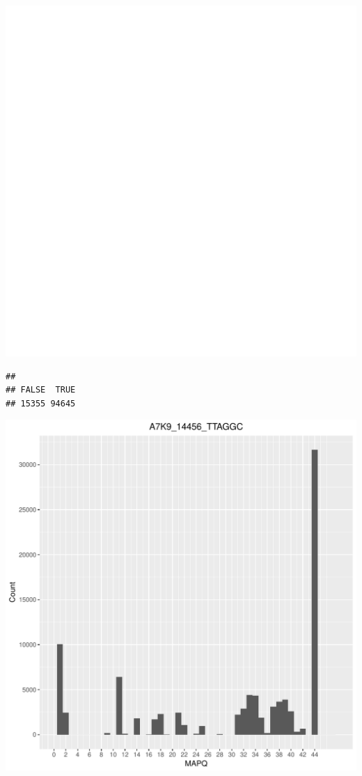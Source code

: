\documentclass[12pt, a4paper]{article}\usepackage[]{graphicx}\usepackage[]{color}
\makeatletter
\def\maxwidth{ %
  \ifdim\Gin@nat@width>\linewidth
    \linewidth
  \else
    \Gin@nat@width
  \fi
}
\newenvironment{kframe}{%
 \def\at@end@of@kframe{}%
 \ifinner\ifhmode%
  \def\at@end@of@kframe{\end{minipage}}%
  \begin{minipage}{\columnwidth}%
 \fi\fi%
 \def\FrameCommand##1{\hskip\@totalleftmargin \hskip-\fboxsep
 \colorbox{shadecolor}{##1}\hskip-\fboxsep
     \hskip-\linewidth \hskip-\@totalleftmargin \hskip\columnwidth}%
 \MakeFramed {\advance\hsize-\width
   \@totalleftmargin\z@ \linewidth\hsize
   \@setminipage}}%
 {\par\unskip\endMakeFramed%
 \at@end@of@kframe}
\newenvironment{knitrout}{}{} %
\makeatother
\begin{document}
\begin{knitrout}
\includegraphics[width=\maxwidth]{figure/unnamed-chunk-3-10} 
\begin{kframe}\begin{verbatim}
## 
## FALSE  TRUE 
## 15355 94645
\end{verbatim}
\end{kframe}
\includegraphics[width=\maxwidth]{figure/unnamed-chunk-3-11} 


\end{knitrout}
\end{document}
